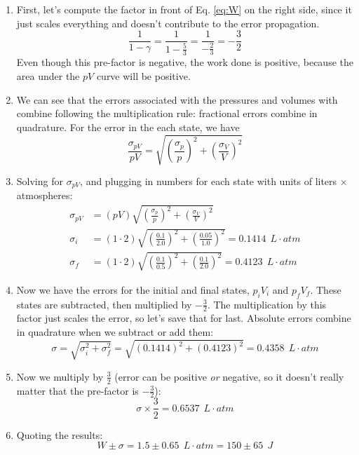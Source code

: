 \documentclass[12pt]{article}
\begin{document}
\begin{enumerate}
\item First, let's compute the factor in front of Eq. \ref{eq:W} on the right side, since it just scales everything and doesn't contribute to the error propagation.
\begin{equation}
\frac{1}{1-\gamma} = \frac{1}{1-\frac{5}{3}} = \frac{1}{-\frac{2}{3}} = -\frac{3}{2}
\end{equation}
Even though this pre-factor is negative, the work done is positive, because the area under the $pV$ curve will be positive.
\item We can see that the errors associated with the pressures and volumes with combine following the multiplication rule: fractional errors combine in quadrature.  For the error in the each state, we have
\begin{equation}
\frac{\sigma_{pV}}{pV} = \sqrt{\left(\frac{\sigma_p}{p}\right)^2+\left(\frac{\sigma_V}{V}\right)^2}
\end{equation}
\item Solving for $\sigma_{pV}$, and plugging in numbers for each state with units of liters $\times$ atmospheres:
\begin{align}
\sigma_{pV} &= (pV)\sqrt{\left(\frac{\sigma_p}{p}\right)^2+\left(\frac{\sigma_V}{V}\right)^2} \\
\sigma_{i} &= (1\cdot 2)\sqrt{\left(\frac{0.1}{2.0}\right)^2+\left(\frac{0.05}{1.0}\right)^2} = 0.1414~~L\cdot atm \\ 
\sigma_{f} &= (1\cdot 2)\sqrt{\left(\frac{0.1}{0.5}\right)^2+\left(\frac{0.1}{2.0}\right)^2} = 0.4123~~L\cdot atm
\end{align}
\item Now we have the errors for the initial and final states, $p_i V_i$ and $p_f V_f$.  These states are subtracted, then multiplied by $-\frac{3}{2}$.  The multiplication by this factor just scales the error, so let's save that for last.  Absolute errors combine in quadrature when we subtract or add them:
\begin{equation}
\sigma = \sqrt{\sigma_{i}^2+\sigma_{f}^2} = \sqrt{(0.1414)^2+(0.4123)^2} = 0.4358 ~~ L \cdot atm
\end{equation}
\item Now we multiply by $\frac{3}{2}$ (error can be positive \textit{or} negative, so it doesn't really matter that the pre-factor is $-\frac{3}{2}$):
\begin{equation}
\sigma \times \frac{3}{2} = 0.6537 ~~ L \cdot atm
\end{equation}
\item Quoting the results:
\begin{equation}
W \pm \sigma = 1.5 \pm 0.65 ~~ L \cdot atm = 150 \pm 65 ~~J
\end{equation}
\end{enumerate}
\end{document}
